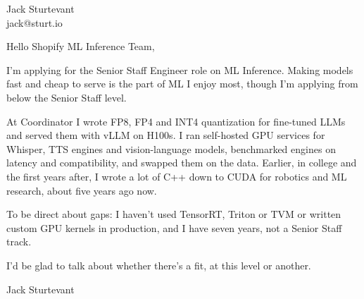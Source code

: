\documentclass[11pt]{article}
\begin{document}
\raggedright

{\namefont\fontsize{20pt}{24pt}\selectfont Jack Sturtevant}\\[-0.3em]
jack@sturt.io

\vspace{1.2em}

Hello Shopify ML Inference Team,

I'm applying for the Senior Staff Engineer role on ML Inference. Making models fast and cheap to serve is the part of ML I enjoy most, though I'm applying from below the Senior Staff level.

At Coordinator I wrote FP8, FP4 and INT4 quantization for fine-tuned LLMs and served them with vLLM on H100s. I ran self-hosted GPU services for Whisper, TTS engines and vision-language models, benchmarked engines on latency and compatibility, and swapped them on the data. Earlier, in college and the first years after, I wrote a lot of C++ down to CUDA for robotics and ML research, about five years ago now.

To be direct about gaps: I haven't used TensorRT, Triton or TVM or written custom GPU kernels in production, and I have seven years, not a Senior Staff track.

I'd be glad to talk about whether there's a fit, at this level or another.

\vspace{0.6em}
Jack Sturtevant
\end{document}
